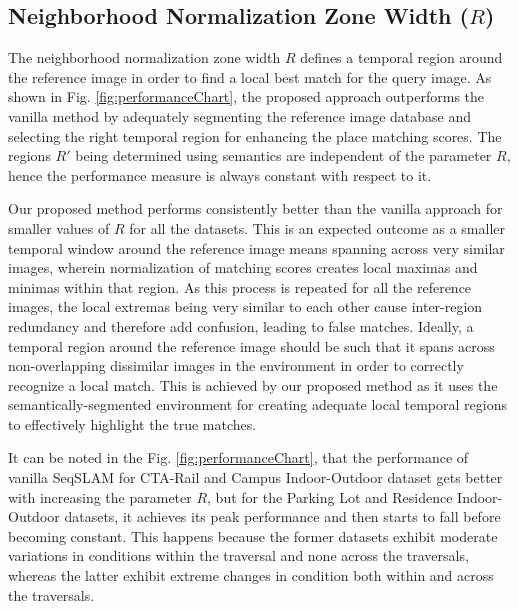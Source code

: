 \documentclass[letterpaper, 10 pt, conference]{ieeeconf}  %
\begin{document}
\subsection{Neighborhood Normalization Zone Width ($R$)}
The neighborhood normalization zone width $R$ defines a temporal region around the reference image in order to find a local best match for the query image. As shown in Fig. \ref{fig:performanceChart}, the proposed approach outperforms the vanilla method by adequately segmenting the reference image database and selecting the right temporal region for enhancing the place matching scores. The regions $R'$ being determined using semantics are independent of the parameter $R$, hence the performance measure is always constant with respect to it.

Our proposed method performs consistently better than the vanilla approach for smaller values of $R$ for all the datasets. This is an expected outcome as a smaller temporal window around the reference image means spanning across very similar images, wherein normalization of matching scores creates local maximas and minimas within that region. As this process is repeated for all the reference images, the local extremas being very similar to each other cause inter-region redundancy and therefore add confusion, leading to false matches. Ideally, a temporal region around the reference image should be such that it spans across non-overlapping dissimilar images in the environment in order to correctly recognize a local match. This is achieved by our proposed method as it uses the semantically-segmented environment for creating adequate local temporal regions to effectively highlight the true matches.

It can be noted in the Fig. \ref{fig:performanceChart}, that the performance of vanilla SeqSLAM for CTA-Rail and Campus Indoor-Outdoor dataset gets better with increasing the parameter $R$, but for the Parking Lot and Residence Indoor-Outdoor datasets, it achieves its peak performance and then starts to fall before becoming constant. This happens because the former datasets exhibit moderate variations in conditions within the traversal and none across the traversals, whereas the latter exhibit extreme changes in condition both within and across the traversals. 
\end{document}
